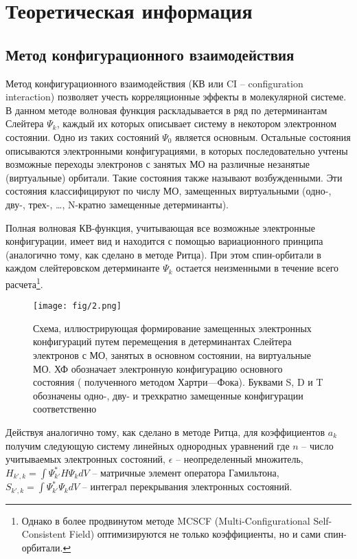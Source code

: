 \section{Теоретическая информация}
\subsection{Метод конфигурационного взаимодействия}
Метод конфигурационного взаимодействия (КВ или CI -- configuration interaction) позволяет учесть корреляционные эффекты в молекулярной системе. В данном методе волновая функция раскладывается в ряд по детерминантам Слейтера $\Psi_k$, каждый их которых описывает систему в некотором электронном состоянии. Одно из таких состояний $\Psi_0$ является основным. Остальные состояния описываются электронными конфигурациями, в которых последовательно учтены возможные переходы электронов с занятых МО на различные незанятые (виртуальные) орбитали. Такие состояния также называют возбужденными. Эти состояния классифицируют по числу МО, замещенных виртуальными (одно-, дву-, трех-, \ldots, N-кратно замещенные детерминанты). 

Полная волновая КВ-функция, учитывающая все возможные электронные конфигурации, имеет вид
и находится с помощью вариационного принципа (аналогично тому, как сделано в методе Ритца). При этом спин-орбитали в каждом слейтеровском детерминанте $\Psi_k$ остается неизменными в течение всего расчета\footnote{Однако в более продвинутом методе MCSCF (Multi-Configurational Self-Consistent Field) оптимизируются не только коэффициенты, но и сами спин-орбитали.}.

\begin{figure}[H]
\centering
\captionsetup{justification=centering}
\texttt{[image: fig/2.png]}
\caption{Схема, иллюстрирующая формирование замещенных электронных конфигураций путем перемещения в детерминантах Слейтера электронов с МО, занятых в основном состоянии, на виртуальные МО. ХФ обозначает электронную конфигурацию основного состояния ( полученного методом Хартри—Фока). Буквами S, D и T обозначены одно-, дву- и трехкратно замещенные конфигурации соответственно}
\end{figure}

Действуя аналогично тому, как сделано в методе Ритца, для коэффициентов $a_k$ получим следующую систему линейных однородных уравнений
где $n$ -- число учитываемых электронных состояний, $\epsilon$ -- неопределенный множитель, $H_{k', k} = \int\Psi_{k'}^{\ast}H\Psi_{k}dV$ -- матричные элемент оператора Гамильтона, $S_{k', k} = \int\Psi_{k'}^{\ast}\Psi_{k}dV$ -- интеграл перекрывания электронных состояний.

